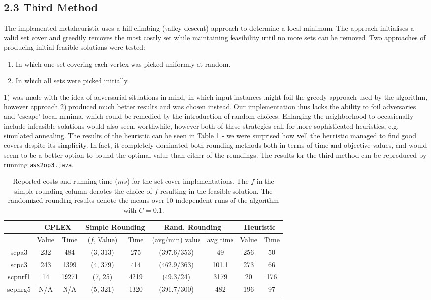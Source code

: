 \documentclass[12pt]{article}
\begin{document}
\subsection*{2.3 Third Method}
The implemented metaheuristic uses a hill-climbing (valley descent) approach to determine a local minimum. The approach initialises a valid set cover and greedily removes the most costly set while maintaining feasibility until no more sets can be removed. Two approaches of producing initial feasible solutions were tested:
\begin{enumerate}
\item In which one set covering each vertex was picked uniformly at random.
\item In which all sets were picked initially.
\end{enumerate}
1) was made with the idea of adversarial situations in mind, in which input instances might foil the greedy approach used by the algorithm, however approach 2) produced much better results and was chosen instead. Our implementation thus lacks the ability to foil adversaries and 'escape' local minima, which could be remedied by the introduction of random choices. Enlarging the neighborhood to occasionally include infeasible solutions would also seem worthwhile, however both of these strategies call for more sophisticated heuristics, e.g. simulated annealing. The results of the heuristic can be seen in Table \ref{times} - we were surprised how well the heuristic managed to find good covers despite its simplicity. In fact, it completely dominated both rounding methods both in terms of time and objective values, and would seem to be a better option to bound the optimal value than either of the roundings. The results for the third method can be reproduced by running {\tt ass2op3.java}. 

\begin{table}[!hbt]
\center
\begin{tabular}{|c | c | c | c | c | c | c  | c  | c |}
\hline
& \multicolumn{2}{|c|}{CPLEX} & \multicolumn{2}{|c|}{Simple Rounding} & \multicolumn{2}{|c|}{Rand. Rounding} & \multicolumn{2}{|c|}{Heuristic}  \\
\hline
& Value & Time & ($f$, Value) & Time & (avg/min) value & avg time & Value & Time\\
\hline
scpa3 & 232 & 484 & (3, 313) & 275 & (397.6/353) & 49 & 256 & 50\\
\hline
scpc3 & 243 & 1399& (4, 379) & 414 & (462.9/363) & 101.1 & 273 & 66\\
\hline
scpnrf1 & 14 & 19271& (7, 25) & 4219 & (49.3/24) & 3179 & 20 & 176\\
\hline
scpnrg5 & N/A & N/A & (5, 321) & 1320 & (391.7/300) & 482 & 196 & 97\\
\hline 
\end{tabular}
\caption{Reported costs and running time ($ms$) for the set cover implementations. The $f$ in the simple rounding column denotes the choice of $f$ resulting in the feasible solution. The randomized rounding results denote the means over 10 independent runs of the algorithm with $C=0.1$.
\label{times}}
\end{table}
\end{document}

